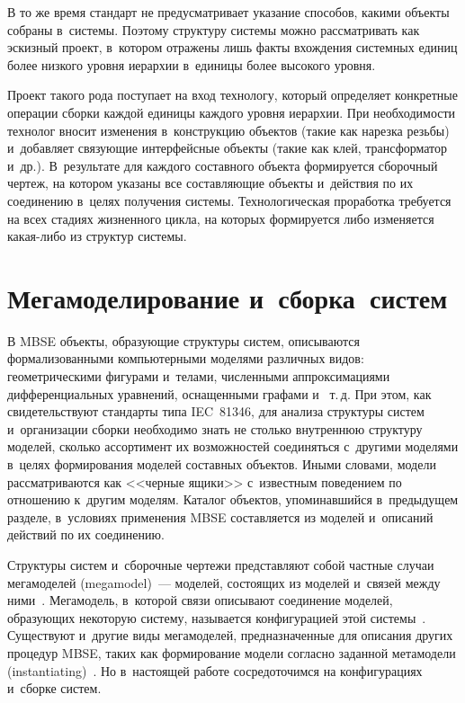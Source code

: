 \begin{multicols}{2}
   В то же время стандарт не предусматривает указа\-ние способов, какими 
объекты собраны в~сис\-те\-мы. Поэтому структуру сис\-те\-мы можно рас\-смат\-ри\-вать 
как эскизный проект, в~котором отражены лишь факты вхождения системных 
единиц более низкого уровня иерархии в~единицы более высокого уровня. 


Проект такого рода поступает на вход технологу, который определяет 
конкретные операции сборки каждой единицы каждого уровня иерархии. При 
необходимости технолог вносит изменения в~конструкцию объектов (такие как 
нарезка резьбы) и~добавляет связующие интерфейсные объекты (такие как 
клей, трансформатор и~др.). В~результате для каждого составного объекта 
формируется сборочный чертеж, на котором указаны все со\-став\-ля\-ющие 
объекты и~действия по их соединению в~целях получения сис\-те\-мы. 
Технологическая проработка требуется на всех стадиях жизненного цикла, на 
которых формируется либо изменяется ка\-кая-ли\-бо из структур системы.


\section{Мегамоделирование и~сборка~систем}

   В MBSE объекты, образующие 
структуры\linebreak
 сис\-тем, описываются формализованными ком\-пьютерными моделями 
различных видов: геометрическими фигурами и~телами, численными 
аппроксимациями дифференциальных уравнений, оснащенными графами и~
т.\,д. При этом, как свидетель\-ст\-ву\-ют стандарты типа IEC~81346, для анализа 
структуры систем и~организации сборки необходимо знать не столько 
внутреннюю структуру моделей, сколько ассортимент их возможностей 
соединяться с~другими моделями в~целях формирования моделей составных 
объектов. Иными словами, модели рассматриваются как <<черные ящики>> 
с~известным поведением по отношению к~другим моделям. Каталог объектов, 
упоминавшийся в~предыду\-щем разделе, в~условиях применения \mbox{MBSE} 
составляется из моделей и~описаний действий по их соединению.
   
   Структуры систем и~сборочные чертежи представляют собой частные 
случаи мегамоделей (mega\-mod\-el)~--- моделей, состоящих из моделей и~связей 
между ними~\cite{8-kov}. Мегамодель, в~которой связи описывают соединение 
моделей, образующих некоторую сис\-те\-му, называется конфигурацией этой 
сис\-те\-мы~\cite{5-kov}. Существуют и~другие виды мегамоделей, 
предназначенные для описания других процедур \mbox{MBSE}, таких как 
формирование модели согласно заданной метамодели  
(instantiating)~\cite{9-kov}. Но в~настоящей работе сосредоточимся на 
конфигурациях и~сборке систем.
   

\end{multicols}
